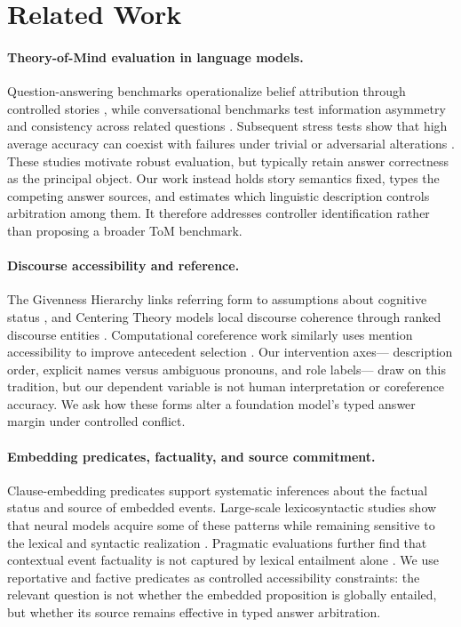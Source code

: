 \section{Related Work}

\paragraph{Theory-of-Mind evaluation in language models.}
Question-answering benchmarks operationalize belief attribution through
controlled stories \citep{le-etal-2019-revisiting}, while conversational
benchmarks test information asymmetry and consistency across related questions
\citep{kim-etal-2023-fantom}. Subsequent stress tests show that high average
accuracy can coexist with failures under trivial or adversarial alterations
\citep{ullman2023trivial,shapira2024cleverhans}. These studies motivate robust
evaluation, but typically retain answer correctness as the principal object.
Our work instead holds story semantics fixed, types the competing answer
sources, and estimates which linguistic description controls arbitration among
them. It therefore addresses controller identification rather than proposing a
broader ToM benchmark.

\paragraph{Discourse accessibility and reference.}
The Givenness Hierarchy links referring form to assumptions about cognitive
status \citep{gundel1993givenness}, and Centering Theory models local discourse
coherence through ranked discourse entities \citep{grosz1995centering}.
Computational coreference work similarly uses mention accessibility to improve
antecedent selection \citep{webster-nothman-2016-using}. Our intervention axes---
description order, explicit names versus ambiguous pronouns, and role labels---
draw on this tradition, but our dependent variable is not human interpretation
or coreference accuracy. We ask how these forms alter a foundation model's
typed answer margin under controlled conflict.

\paragraph{Embedding predicates, factuality, and source commitment.}
Clause-embedding predicates support systematic inferences about the factual
status and source of embedded events. Large-scale lexicosyntactic studies show
that neural models acquire some of these patterns while remaining sensitive to
the lexical and syntactic realization \citep{white-etal-2018-lexicosyntactic}.
Pragmatic evaluations further find that contextual event factuality is not
captured by lexical entailment alone \citep{jiang-de-marneffe-2021-thinks}. We
use reportative and factive predicates as controlled accessibility constraints:
the relevant question is not whether the embedded proposition is globally
entailed, but whether its source remains effective in typed answer arbitration.

